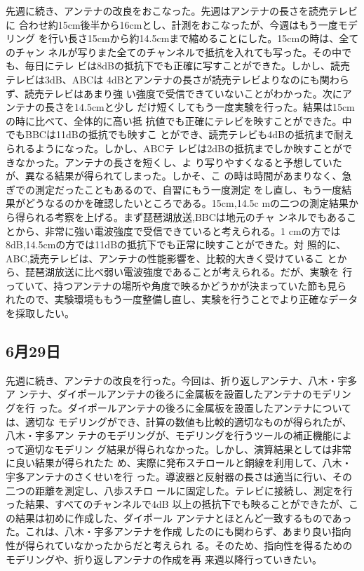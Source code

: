 \documentclass[dvipdfmx,autodetect-engine,titlepage]{jsarticle}
\begin{document}
先週に続き、アンテナの改良をおこなった。先週はアンテナの長さを読売テレビに
合わせ約15cm後半から16cmとし、計測をおこなったが、今週はもう一度モデリング
を行い長さ15cmから約14.5cmまで縮めることにした。15cmの時は、全てのチャン
ネルが写りまた全てのチャンネルで抵抗を入れても写った。その中でも、毎日にテレ
ビは8dBの抵抗下でも正確に写すことができた。しかし、読売テレビは3dB、ABCは
4dBとアンテナの長さが読売テレビよりなのにも関わらず、読売テレビはあまり強
い強度で受信できていないことがわかった。次にアンテナの長さを14.5cmと少し
だけ短くしてもう一度実験を行った。結果は15cmの時に比べて、全体的に高い抵
抗値でも正確にテレビを映すことができた。中でもBBCは11dBの抵抗でも映すこ
とができ、読売テレビも4dBの抵抗まで耐えられるようになった。しかし、ABCテ
レビは2dBの抵抗までしか映すことができなかった。アンテナの長さを短くし、よ
り写りやすくなると予想していたが、異なる結果が得られてしまった。しかそ、こ
の時は時間があまりなく、急ぎでの測定だったこともあるので、自習にもう一度測定
をし直し、もう一度結果がどうなるのかを確認したいところである。15cm,14.5c
mの二つの測定結果から得られる考察を上げる。まず琵琶湖放送,BBCは地元のチャ
ンネルでもあることから、非常に強い電波強度で受信できていると考えられる。1
cmの方では8dB,14.5cmの方では11dBの抵抗下でも正常に映すことができた。対
照的に、ABC,読売テレビは、アンテナの性能影響を、比較的大きく受けているこ
とから、琵琶湖放送に比べ弱い電波強度であることが考えられる。だが、実験を
行っていて、持つアンテナの場所や角度で映るかどうかが決まっていた節も見ら
れたので、実験環境ももう一度整備し直し、実験を行うことでより正確なデータ
を採取したい。

\subsection*{6月29日}

先週に続き、アンテナの改良を行った。今回は、折り返しアンテナ、八木・宇多ア
ンテナ、ダイポールアンテナの後ろに金属板を設置したアンテナのモデリングを行
った。ダイポールアンテナの後ろに金属板を設置したアンテナについては、適切な
モデリングができ、計算の数値も比較的適切なものが得られたが、八木・宇多アン
テナのモデリングが、モデリングを行うツールの補正機能によって適切なモデリン
グ結果が得られなかった。しかし、演算結果としては非常に良い結果が得られたた
め、実際に発布スチロールと銅線を利用して、八木・宇多アンテナのさくせいを行
った。導波器と反射器の長さは適当に行い、その二つの距離を測定し、八歩スチロ
ールに固定した。テレビに接続し、測定を行った結果、すべてのチャンネルで4dB
以上の抵抗下でも映ることができたが、この結果は初めに作成した、ダイポール
アンテナとほとんど一致するものであった。これは、八木・宇多アンテナを作成
したのにも関わらず、あまり良い指向性が得られていなかったからだと考えられ
る。そのため、指向性を得るためのモデリングや、折り返しアンテナの作成を再
来週以降行っていきたい。
\end{document}
